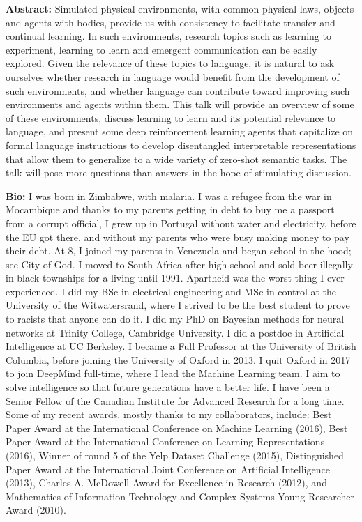 \documentclass[11pt]{article}
\begin{document}
{\bf Abstract:}
Simulated physical environments, with common physical laws, objects and agents with bodies, provide us with consistency to facilitate transfer and continual learning. In such environments, research topics such as learning to experiment, learning to learn and emergent communication can be easily explored. Given the relevance of these topics to language, it is natural to ask ourselves whether research in language would benefit from the development of such environments, and whether language can contribute toward improving such environments and agents within them. This talk will provide an overview of some of these environments, discuss learning to learn and its potential relevance to language, and present some deep reinforcement learning agents that capitalize on formal language instructions to develop disentangled interpretable representations that allow them to generalize to a wide variety of zero-shot semantic tasks. The talk will pose more questions than answers in the hope of stimulating discussion.

{\bf Bio:} 
I was born in Zimbabwe, with malaria. I was a refugee from the war in Mocambique and thanks to my parents getting in debt to buy me a passport from a corrupt official, I grew up in Portugal without water and electricity, before the EU got there, and without my parents who were busy making money to pay their debt. At 8, I joined my parents in Venezuela and began school in the hood; see City of God. I moved to South Africa after high-school and sold beer illegally in black-townships for a living until 1991. Apartheid was the worst thing I ever experienced. I did my BSc in electrical engineering and MSc in control at the University of the Witwatersrand, where I strived to be the best student to prove to racists that anyone can do it. I did my PhD on Bayesian methods for neural networks at Trinity College, Cambridge University. I did a postdoc in Artificial Intelligence at UC Berkeley. I became a Full Professor at the University of British Columbia, before joining the University of Oxford in 2013. I quit Oxford in 2017 to join DeepMind full-time, where I lead the Machine Learning team. I aim to solve intelligence so that future generations have a better life. I have been a Senior Fellow of the Canadian Institute for Advanced Research for a long time. Some of my recent awards, mostly thanks to my collaborators, include: Best Paper Award at the International Conference on Machine Learning (2016), Best Paper Award at the International Conference on Learning Representations (2016), Winner of round 5 of the Yelp Dataset Challenge (2015), Distinguished Paper Award at the International Joint Conference on Artificial Intelligence (2013), Charles A. McDowell Award for Excellence in Research (2012), and Mathematics of Information Technology and Complex Systems Young Researcher Award (2010).
\end{document}
